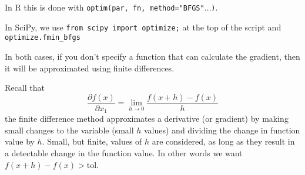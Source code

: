 \documentclass[11pt]{article}
\begin{document}
In R this is done with {\tt optim(par, fn, method="BFGS"$\ldots$)}.

In SciPy, we use {\tt from scipy import optimize;} at the top of the script and {\tt optimize.fmin\_bfgs}

In both cases, if you don't specify a function that can calculate the gradient, then it will be approximated using finite differences.

Recall that 
$$\frac{\partial f(x)}{\partial x_1} = \lim_{h \rightarrow 0}\frac{f(x+h)-f(x)}{h}$$
the finite difference method approximates a derivative (or gradient) by making small changes to the variable (small $h$ values) and dividing the change in function value by $h$.
Small, but finite, values of $h$ are considered, as long as they result in a detectable change in the function value. 
In other words we want $f(x+h)-f(x) > \mbox{tol}$.

\end{document}

